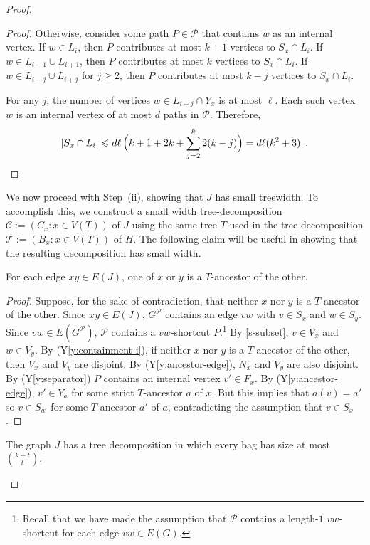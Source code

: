 \documentclass{patmorin}
\newcommand{\yref}[1]{(Y\ref{y:#1})}
\renewcommand{\ge}{\geqslant}
\renewcommand{\le}{\leqslant}
\begin{document}
\begin{proof}
\begin{proof}
  Otherwise, consider some path $P\in\mathcal{P}$ that contains $w$ as an internal vertex.  If $w\in L_{i}$, then $P$ contributes at most $k+1$ vertices to $S_x\cap L_i$.  If $w\in L_{i-1}\cup L_{i+1}$, then $P$ contributes at most $k$ vertices to $S_x\cap L_i$. If $w\in L_{i-j}\cup L_{i+j}$ for $j\ge 2$, then $P$ contributes at most $k-j$ vertices to $S_x\cap L_i$.

  For any $j$, the number of vertices $w\in L_{i+j}\cap Y_x$ is at most $\ell$. Each such vertex $w$ is an internal vertex of at most $d$ paths in $\mathcal{P}$. Therefore,
  \[  |S_x\cap L_i|\le d\ell  \, \Big(k+1 + 2k + \sum_{j=2}^k 2(k-j)\Big) %
      = d\ell(k^2 +3) \enspace . \qedhere
  \]
\end{proof}

We now proceed with Step~(ii), showing that $J$ has small treewidth. To accomplish this, we construct a small width tree-decomposition $\mathcal{C}:=(C_x:x\in V(T))$ of $J$ using the same tree $T$ used in the tree decomposition $\mathcal{T}:=(B_x:x\in V(T))$ of $H$.  The following claim will be useful in showing that the resulting decomposition has small width.

\begin{clm}\label{i-ancestor}
  For each edge $xy\in E(J)$, one of $x$ or $y$ is a $T$-ancestor of the other.
\end{clm}

\begin{proof}
  Suppose, for the sake of contradiction, that neither $x$ nor $y$ is a $T$-ancestor of the other.  Since $xy\in E(J)$, $G^\mathcal{P}$ contains an edge $vw$ with $v\in S_x$ and $w\in S_y$.  Since $vw\in E(G^{\mathcal{P}})$,  $\mathcal{P}$ contains a $vw$-shortcut $P$.\footnote{Recall that we have made the assumption that $\mathcal{P}$ contains a length-$1$ $vw$-shortcut for each edge $vw\in E(G)$.}  By \cref{s-subset}, $v\in V_x$ and $w\in V_y$.  By \yref{containment-i}, if neither $x$ nor $y$ is a $T$-ancestor of the other, then $V_x$ and $V_y$ are disjoint.  By \yref{ancestor-edge}, $N_x$ and $V_y$ are also disjoint.  By \yref{separator} $P$ contains an internal vertex $v'\in F_x$.  By \yref{ancestor-edge}, $v'\in Y_a$ for some strict $T$-ancestor $a$ of $x$.  But this implies that $a(v)=a'$ so $v\in S_{a'}$ for some $T$-ancestor $a'$ of $a$, contradicting the assumption that $v\in S_x$.
\end{proof}

\begin{clm}
	\label{general-bag-size}
  The graph $J$ has a tree decomposition in which every bag has size at most $\binom{k+t}{t}$.
\end{clm}


\end{proof}
\end{document}
